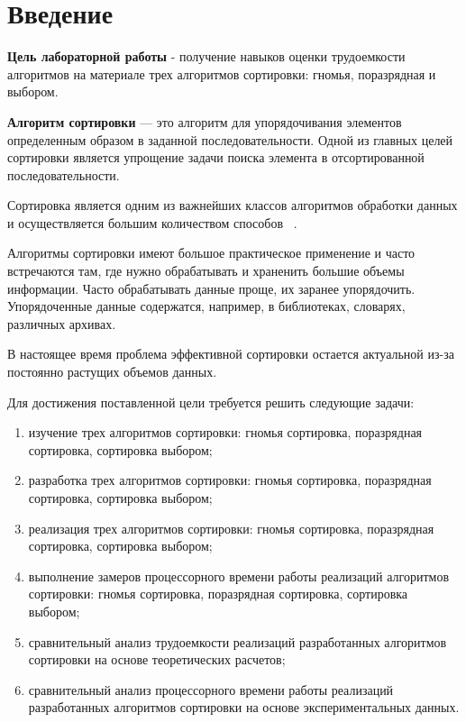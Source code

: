 \chapter*{Введение}
\textbf{Цель лабораторной работы} - получение навыков оценки трудоемкости алгоритмов на материале трех алгоритмов сортировки: гномья, поразрядная и выбором.

\textbf{Алгоритм сортировки} — это алгоритм для упорядочивания элементов определенным образом в заданной последовательности. 
Одной из главных целей сортировки является упрощение задачи поиска элемента в отсортированной последовательности.

Сортировка является одним из важнейших классов алгоритмов обработки данных и осуществляется большим количеством способов ~\cite{sorts_book}.

Алгоритмы сортировки имеют большое практическое применение и часто встречаются там, где нужно обрабатывать и храненить большие объемы информации.
Часто обрабатывать данные проще, их заранее упорядочить.
Упорядоченные данные содержатся, например, в библиотеках, словарях, различных архивах.

В настоящее время проблема эффективной сортировки остается актуальной из-за постоянно растущих объемов данных.

Для достижения поставленной цели требуется решить следующие задачи:
\begin{enumerate}[label={\arabic*)}]
    \item изучение трех алгоритмов сортировки: гномья сортировка, поразрядная сортировка, сортировка выбором;
    \item разработка трех алгоритмов сортировки: гномья сортировка, поразрядная сортировка, сортировка выбором;
    \item реализация трех алгоритмов сортировки: гномья сортировка, поразрядная сортировка, сортировка выбором;
    \item выполнение замеров процессорного времени работы реализаций алгоритмов сортировки: гномья сортировка, поразрядная сортировка, сортировка выбором;
	\item сравнительный анализ трудоемкости реализаций разработанных алгоритмов сортировки на основе теоретических расчетов;
	\item сравнительный анализ процессорного времени работы реализаций разработанных алгоритмов сортировки на основе экспериментальных данных.
\end{enumerate}
